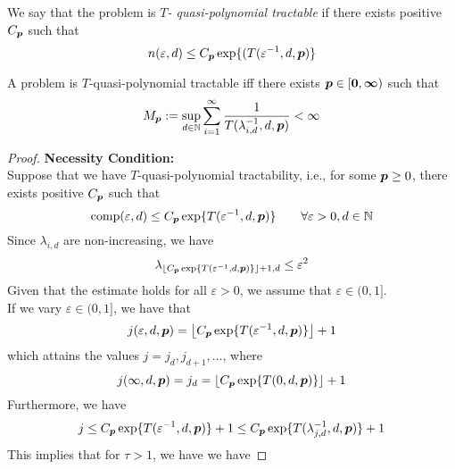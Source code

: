 \documentclass[11pt,a4paper]{article}
\begin{document}
\begin{definition}
We say that the problem is \emph{$T$- quasi-polynomial tractable} if there exists positive $C_{\boldsymbol{p}}$ such that
   \[ n(\varepsilon,d)\leq C_{\boldsymbol{p}}\exp\{(T(\varepsilon^{-1},d,\boldsymbol{p})\}\]
\end{definition}

\begin{theorem}\label{thm:qpt}
A problem is $T$-quasi-polynomial tractable iff there exists $\boldsymbol{p} \in [\boldsymbol{0}, \boldsymbol{\infty})$ such that
\begin{equation}\label{thmqpt}
M_{\boldsymbol{p}} := \sup_{d\in\mathbb{N}}\sum_{i=1}^\infty \frac{1}{T(\lambda_{i,d}^{-1},d,\boldsymbol{p})}
<\infty
\end{equation}
\end{theorem}
\begin{proof}
\textbf{Necessity Condition:}\\
Suppose that we have $T$-quasi-polynomial tractability, i.e., for some $\boldsymbol{p}\geq 0$, there exists positive $C_{\boldsymbol{p}}$ such that
\[
\operatorname{comp}(\varepsilon,d)\le C_{\boldsymbol{p}}\exp\{T(\varepsilon^{-1},d,\boldsymbol{p})\}
\quad\quad \forall\varepsilon >0, d\in \mathbb{N}
\] 
Since $\lambda_{i,d}$ are non-increasing, we have
\[
\lambda_{\left\lfloor C_{\boldsymbol{p}}\exp\{T(\varepsilon^{-1},d,\boldsymbol{p})\}\right\rfloor+1,d}\leq \varepsilon^2
\]
Given that the estimate holds for all $\varepsilon> 0$, we assume that $\varepsilon \in (0, 1]$.\\

If we vary $\varepsilon\in (0,1]$, we have that
\[
j(\varepsilon,d,\boldsymbol{p}) = \left\lfloor C_{\boldsymbol{p}}\exp\{T(\varepsilon^{-1},d,\boldsymbol{p})\}\right\rfloor+1
\] which attains the values $j = j_d,j_{d+1},\dots$, where
\[
j(\infty,d,\boldsymbol{p})=j_d = \lfloor C_{\boldsymbol{p}}\exp\{ T(0,d,\boldsymbol{p})\}\rfloor + 1
\]
Furthermore, we have
\[j \leq C_{\boldsymbol{p}}\exp\{T(\varepsilon^{-1},d,\boldsymbol{p})\}+1 \leq C_{\boldsymbol{p}}\exp\{T(\lambda^{-1}_{j,d},d,\boldsymbol{p})\}+1 \]
This implies that for $\tau>1$, we have
we have 
\end{proof}
\end{document}
